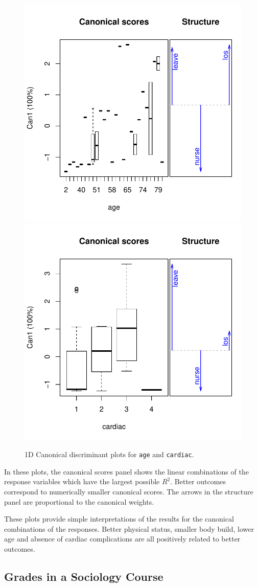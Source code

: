 \documentclass[11pt]{article}
\newcommand{\code}[1]{{\texttt{#1}}}
\begin{document}
\begin{figure}[htb!]
\begin{center}
	\includegraphics[width=.48\textwidth]{fig/plot-hern-can-age}
	\includegraphics[width=.48\textwidth]{fig/plot-hern-can-cardiac}
\caption{1D Canonical discriminant plots for \code{age} and \code{cardiac}.
	}
\label{fig:hern-can2}
\end{center}
\end{figure}

In these plots, the canonical scores panel shows
the linear combinations of the
response variables which have the largest possible $R^2$.
Better outcomes correspond to numerically smaller canonical scores.
The arrows in the structure panel are proportional to
the canonical weights.

These plots provide simple interpretations of the results for the
canonical combinations of the responses.
Better physical status, smaller body build, lower age and absence
of cardiac complications are all positively related to better outcomes.
	

\subsection[SocGrades]{Grades in a Sociology Course}
\end{document}
